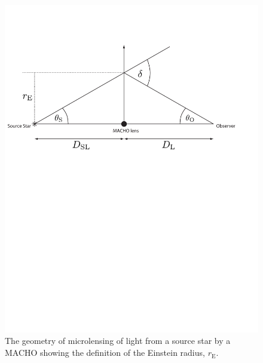 \begin{figure}[p]
\begin{center}
\includegraphics[width=\linewidth]{figures/macho/lensing}
\end{center}
\caption[Gravitational Lensing of Light By a MACHO]{%
\label{f:macholens}
The geometry of microlensing of light from a source star by a MACHO showing
the definition of the Einstein radius, $r_\mathrm{E}$.
}
\end{figure}

